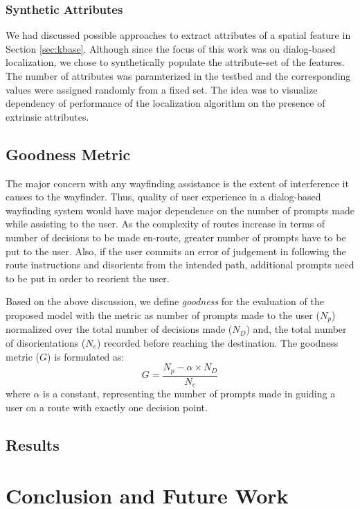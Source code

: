 \documentclass{iitkthesis}
\begin{document}
  \subsection{Synthetic Attributes}
We had discussed possible approaches to extract attributes of a spatial feature in Section \ref{sec:kbase}.  Although since the focus of this work was on dialog-based localization, we chose to synthetically populate the attribute-set of the features. The number of attributes was paramterized in the testbed and the corresponding values were assigned randomly from a fixed set. The idea was to visualize dependency of performance of the localization algorithm on the presence of extrinsic attributes. 
 \section{Goodness Metric}
The major concern with any wayfinding assistance is the extent of interference it causes to the wayfinder. Thus, quality of user experience in a dialog-based wayfinding system would have major dependence on the number of prompts made while assisting to the user. As the complexity of routes increase in terms of number of decisions to be made en-route, greater number of prompts have to be put to the user. Also, if the user commits an error of judgement in following the route instructions and disorients from the intended path, additional prompts need to be put in order to reorient the user. 

Based on the above discussion, we define \textit{goodness} for the evaluation of the proposed model with the metric as number of prompts made to the user ($N_p$) normalized over the total number of decisions made ($N_D$) and, the total number of disorientations ($N_e$) recorded before reaching the destination. The goodness metric ($G$) is formulated as: 
\[\displaystyle G = \frac{N_p - \alpha \times N_D}{N_e}\]  
where $\alpha$ is a constant, representing the number of prompts made in guiding a user on a route with exactly one decision point.
 \section{Results}
 \chapter{Conclusion and Future Work}


\end{document}
